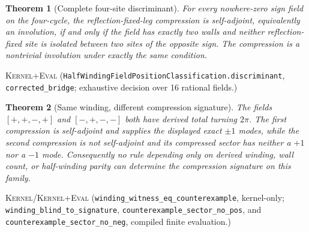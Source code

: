 \documentclass[11pt]{article}
\newcommand{\Kernel}{\textcolor{kernelcolor}{\textsc{Kernel}}}
\newcommand{\DraftTrust}{\textcolor{draftcolor}{\textsc{Kernel+Eval}}}
\newtheorem{theorem}{Theorem}
\begin{document}
\begin{theorem}[Complete four-site discriminant]\label{thm:position}
For every nowhere-zero sign field on the four-cycle, the reflection-fixed-leg
compression is self-adjoint, equivalently an involution, if and only if the
field has exactly two walls and neither reflection-fixed site is isolated
between two sites of the opposite sign.  The compression is a nontrivial
involution under exactly the same condition.
\end{theorem}
\noindent\DraftTrust{}\quad
(\texttt{HalfWindingFieldPositionClassification.discriminant},
\texttt{corrected\_bridge}; exhaustive decision over 16 rational fields.)

\begin{theorem}[Same winding, different compression signature]
The fields $[+,+,-,+]$ and $[-,+,-,-]$ both have derived total turning
$2\pi$.  The first compression is self-adjoint and supplies the displayed
exact $\pm1$ modes, while the second compression is not self-adjoint and its
compressed sector has neither a $+1$ nor a $-1$ mode.  Consequently no rule
depending only on derived winding, wall count, or half-winding parity can
determine the compression signature on this family.
\end{theorem}
\noindent\Kernel{}/\DraftTrust{}\quad
(\texttt{winding\_witness\_eq\_counterexample}, kernel-only;
\texttt{winding\_blind\_to\_signature},
\texttt{counterexample\_sector\_no\_pos}, and
\texttt{counterexample\_sector\_no\_neg}, compiled finite evaluation.)
\end{document}
